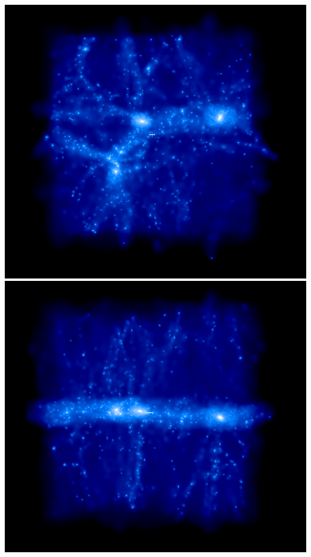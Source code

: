 \includegraphics[scale=0.2]{r128/drdx_h100_r128_2/1.png} 
\includegraphics[scale=0.2]{r128/drdx_h100_r128_2/2.png} 

